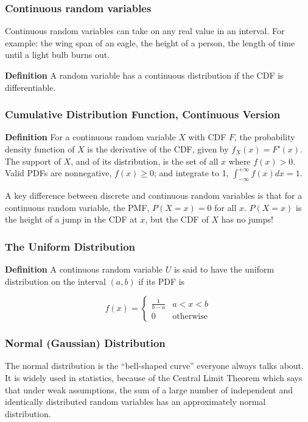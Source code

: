 \documentclass{beamer}
\begin{document}
\begin{frame}
\frametitle{Continuous random variables}

Continuous random variables can take on any real value in an interval. For example: the wing span of an eagle, the height of a person, the length of time until a light bulb burns out.

\bigskip

\textbf{Definition} A random variable has a continuous distribution if the CDF is differentiable.

\end{frame}


\begin{frame}
\frametitle{Cumulative Distribution Function, Continuous Version}

\textbf{Definition} For a continuous random variable $X$ with CDF $F$, the probability density function of $X$ is the derivative of the CDF, given by $f_X(x) = F'(x)$. The support of $X$, and of its distribution, is the set of all $x$ where $f(x) > 0$. Valid PDFs are nonnegative, $f(x) \geq 0$; and integrate to 1, $\int_{-\infty}^{+\infty} f(x)dx = 1$.

\bigskip

A key difference between discrete and continuous random variables is that for a continuous random variable, the PMF, $P(X=x) = 0$ for all $x$. $P(X = x)$ is the height of a jump in the CDF at $x$, but the CDF of $X$ has no jumps!


\end{frame}



\begin{frame}
\frametitle{The Uniform Distribution}

\textbf{Definition} A continuous random variable $U$ is said to have the uniform distribution on the interval $(a,b)$ if its PDF is

\bigskip

\begin{equation}
f(x) = 
	\begin{cases} 
		\frac{1}{b-a} & a < x < b \\
		0 & \textrm{otherwise} 
   \end{cases}
\end{equation}

\end{frame}



\begin{frame}
\frametitle{Normal (Gaussian) Distribution}

The normal distribution is the ``bell-shaped curve'' everyone always talks about. It is widely used in statistics, because of the Central Limit Theorem which says that under weak assumptions, the sum of a large number of independent and identically distributed random variables has an approximately normal distribution.

\end{frame}
\end{document}

